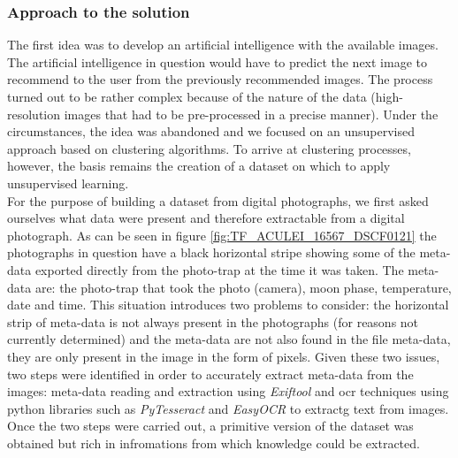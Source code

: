 \documentclass[12pt,a4paper,twoside]{article}
\begin{document}
\subsubsection{Approach to the solution}
The first idea was to develop an artificial intelligence with the available images. The artificial intelligence in question would have to predict the next image to recommend to the user from the previously recommended images. The process turned out to be rather complex because of the nature of the data (high-resolution images that had to be pre-processed in a precise manner). Under the circumstances, the idea was abandoned and we focused on an unsupervised approach based on clustering algorithms. To arrive at clustering processes, however, the basis remains the creation of a dataset on which to apply unsupervised learning. \\ For the purpose of building a dataset from digital photographs, we first asked ourselves what data were present and therefore extractable from a digital photograph. As can be seen in figure \ref{fig:TF_ACULEI_16567_DSCF0121} the photographs in question have a black horizontal stripe showing some of the meta-data exported directly from the photo-trap at the time it was taken. The meta-data are: the photo-trap that took the photo (camera), moon phase, temperature, date and time. This situation introduces two problems to consider: the horizontal strip of meta-data is not always present in the photographs (for reasons not currently determined) and the meta-data are not also found in the file meta-data, they are only present in the image in the form of pixels. Given these two issues, two steps were identified in order to accurately extract meta-data from the images: meta-data reading and extraction using \textit{Exiftool} \cite{exiftool} and ocr techniques using python libraries such as \textit{PyTesseract} \cite{pytesseract} and \textit{EasyOCR} \cite{easyocr} to extractg text from images. Once the two steps were carried out, a primitive version of the dataset was obtained but rich in infromations from which knowledge could be extracted.
\end{document}
